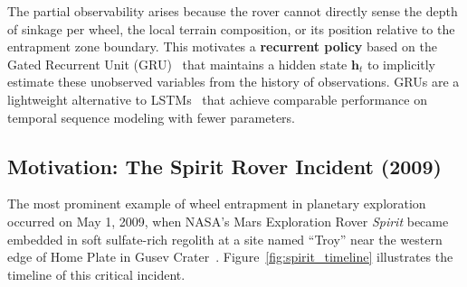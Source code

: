 \documentclass[12pt,a4paper]{article}
\begin{document}
The partial observability arises because the rover cannot directly sense the depth of sinkage per wheel, the local terrain composition, or its position relative to the entrapment zone boundary. This motivates a \textbf{recurrent policy} based on the Gated Recurrent Unit (GRU)~\cite{cho2014gru} that maintains a hidden state $\mathbf{h}_t$ to implicitly estimate these unobserved variables from the history of observations. GRUs are a lightweight alternative to LSTMs~\cite{hochreiter1997lstm} that achieve comparable performance on temporal sequence modeling with fewer parameters.

\subsection{Motivation: The Spirit Rover Incident (2009)}

The most prominent example of wheel entrapment in planetary exploration occurred on May 1, 2009, when NASA's Mars Exploration Rover \textit{Spirit} became embedded in soft sulfate-rich regolith at a site named ``Troy'' near the western edge of Home Plate in Gusev Crater~\cite{arvidson2011spirit,squyres2004mer}. Figure~\ref{fig:spirit_timeline} illustrates the timeline of this critical incident.
\end{document}
